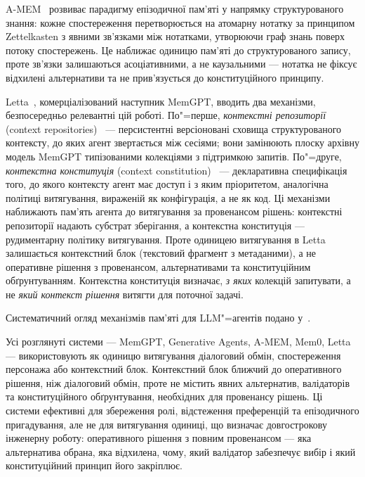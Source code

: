 

A-MEM~\citep{xu2024amem} розвиває парадигму епізодичної пам'яті у напрямку структурованого
знання: кожне спостереження перетворюється на атомарну нотатку за принципом
Zettelkasten з явними зв'язками між нотатками, утворюючи граф знань поверх
потоку спостережень.
Це наближає одиницю пам'яті до структурованого запису, проте зв'язки
залишаються асоціативними, а не каузальними --- нотатка не фіксує
відхилені альтернативи та не прив'язується до конституційного принципу.

Letta~\citep{letta2025lettacode}, комерціалізований наступник MemGPT, вводить два механізми,
безпосередньо релевантні цій роботі.
По"=перше, \emph{контекстні репозиторії} (context repositories)~\citep{letta2026repositories} ---
персистентні версіоновані сховища структурованого контексту, до яких агент
звертається між сесіями; вони замінюють плоску архівну модель MemGPT
типізованими колекціями з підтримкою запитів.
По"=друге, \emph{контекстна конституція} (context constitution)~\citep{letta2026constitution} ---
декларативна специфікація того, до якого контексту агент має доступ і
з яким пріоритетом, аналогічна політиці витягування, вираженій як конфігурація,
а не як код.
Ці механізми наближають пам'ять агента до витягування за провенансом рішень:
контекстні репозиторії надають субстрат зберігання, а контекстна конституція ---
рудиментарну політику витягування.
Проте одиницею витягування в Letta залишається контекстний блок
(текстовий фрагмент з метаданими), а не оперативне рішення з провенансом,
альтернативами та конституційним обґрунтуванням.
Контекстна конституція визначає, \emph{з яких} колекцій запитувати,
а не \emph{який контекст рішення} витягти для поточної задачі.

Систематичний огляд механізмів пам'яті для LLM"=агентів подано
у~\citet{zhang2024survey}.

Усі розглянуті системи --- MemGPT, Generative Agents, A-MEM, Mem0, Letta ---
використовують як одиницю витягування діалоговий обмін, спостереження персонажа
або контекстний блок.
Контекстний блок ближчий до оперативного рішення, ніж діалоговий обмін,
проте не містить явних альтернатив, валідаторів та конституційного обґрунтування,
необхідних для провенансу рішень.
Ці системи ефективні для збереження ролі, відстеження преференцій та
епізодичного пригадування, але не для витягування одиниці, що визначає
довгострокову інженерну роботу: оперативного рішення з повним провенансом ---
яка альтернатива обрана, яка відхилена, чому, який валідатор забезпечує вибір
і який конституційний принцип його закріплює.


